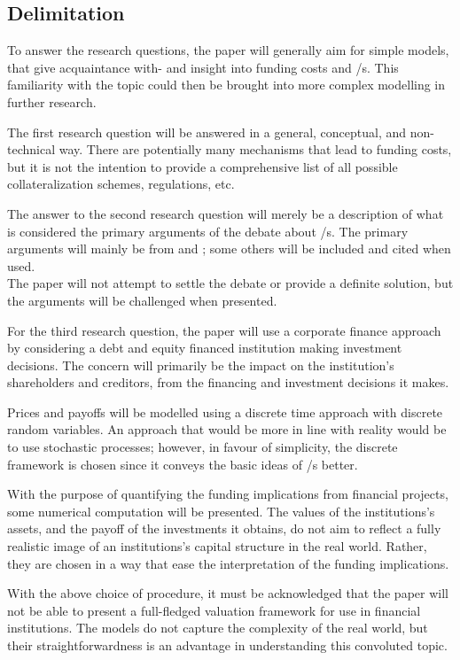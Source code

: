 \documentclass[main.tex]{subfiles}
\begin{document}
    \subsection{Delimitation}

    To answer the research questions, the paper will generally aim for simple models,
    that give acquaintance with- and insight into funding costs and \FVA/s.
    This familiarity with the topic could then be brought into more complex modelling
    in further research.

    The first research question will be answered in a general, conceptual, and 
    non-tech\-nical %
    way.
    There are potentially many mechanisms that lead to funding costs,
    but it is not the intention to provide a comprehensive list 
    of all possible collateralization schemes, regulations, etc.

    The answer to the second research question will merely be a description 
    of what is considered the primary arguments of the debate about \FVA/s.
    The primary arguments will mainly be from 
    \textcite{HullWhite2012FVA} and \textcite{Castagna2012FVA};
    some others will be included and cited when used.
    \\
    The paper will not attempt to settle the debate or provide a definite solution,
    but the arguments will be challenged when presented.

    For the third research question, the paper will use a corporate finance approach
    by considering a debt and equity financed institution making investment decisions.
    The concern will primarily be the impact on the institution's shareholders and creditors,
    from the financing and investment decisions it makes.

    Prices and payoffs will be modelled using a discrete time approach 
    with discrete random variables.
    An approach that would be more in line with reality would be to use stochastic processes;
    however, in favour of simplicity, the discrete framework is chosen 
    since it conveys the basic ideas of \FVA/s better.

    With the purpose of quantifying the funding implications from financial projects,
    some numerical computation will be presented.
    The values of the institutions's assets, and the payoff of the investments it obtains,
    do not aim to reflect a fully realistic image of an institutions's capital structure in the real world.
    Rather, they are chosen in a way that ease the interpretation of the funding implications.

    With the above choice of procedure, it must be acknowledged that the paper will not be able to
    present a full-fledged valuation framework for use in financial institutions.
    The models do not capture the complexity of the real world,
    but their straightforwardness is an advantage in understanding this convoluted topic.
\end{document}
